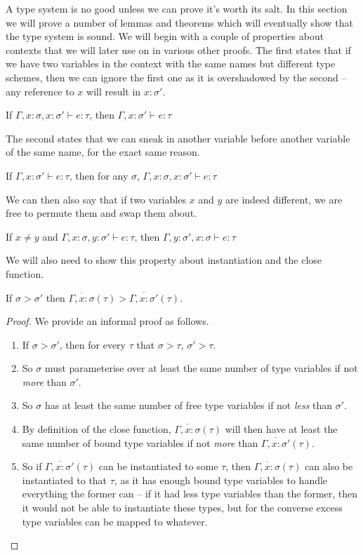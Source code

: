 A type system is no good unless we can prove it's worth its salt. In
this section we will prove a number of lemmas and theorems which will
eventually show that the type system is sound. We will begin with a
couple of properties about contexts that we will later use on in
various other proofs. The first states that if we have two variables
in the context with the same names but different type schemes, then we
can ignore the first one as it is overshadowed by the second -- any
reference to $x$ will result in $x : \sigma'$.
\begin{lemma} \label{lem:drop}
  If $\Gamma , x : \sigma, x : \sigma' \vdash e : \tau$, then $\Gamma , x : \sigma' \vdash e : \tau$
\end{lemma}
The second states that we can sneak in another variable before another
variable of the same name, for the exact same reason.
\begin{lemma} \label{lem:sneak}
  If $\Gamma , x : \sigma' \vdash e : \tau$, then for any $\sigma$, $\Gamma , x : \sigma, x : \sigma' \vdash e : \tau$
\end{lemma}
We can then also say that if two variables $x$ and $y$ are indeed
different, we are free to permute them and swap them about.
\begin{lemma} \label{lem:swap}
  If $x \neq y$ and $\Gamma , x : \sigma, y : \sigma' \vdash e : \tau$, then $\Gamma , y : \sigma' , x : \sigma \vdash e
  : \tau$
\end{lemma}

We will also need to show this property about instantiation and the
close function.
\begin{lemma} \label{lem:close>}
  If $\sigma > \sigma'$ then $\overline{\Gamma , x : \sigma}(\tau) > \overline{\Gamma, x : \sigma'}(\tau)$.
\end{lemma}
\begin{proof}
  We provide an informal proof as follows.
  \begin{enumerate}
  \item If $\sigma > \sigma'$, then for every $\tau$ that $\sigma > \tau$, $\sigma' > \tau$.
  \item So $\sigma$ must parameterise over at least the same number of type
    variables if not \textit{more} than $\sigma'$.
  \item So $\sigma$ has at least the same number of free type variables if
    not \textit{less} than $\sigma'$.
  \item By definition of the close function,
    $\overline{\Gamma, x : \sigma}(\tau)$ will then have at least the same number
    of bound type variables if not \textit{more} than
    $\overline{\Gamma, x : \sigma'}(\tau)$.
  \item So if $\overline{\Gamma, x : \sigma'}(\tau)$ can be instantiated to some
    $\tau$, then $\overline{\Gamma, x : \sigma}(\tau)$ can also be instantiated to
    that $\tau$, as it has enough bound type variables to handle
    everything the former can -- if it had less type variables than the
    former, then it would not be able to instantiate these types, but
    for the converse excess type variables can be mapped to whatever.
  \end{enumerate}
\end{proof}

